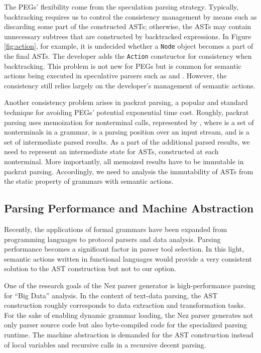 \documentclass[JIP]{ipsj}
\begin{document}
The PEGs' flexibility come from the speculation parsing strategy. Typically, backtracking requires us to control the consistency management by means such as discarding some part of the constructed ASTs; otherwise, the ASTs may contain unnecessary subtrees that are constructed by backtracked expressions. In Figure \ref{fig:action}, for example, it is undecided whether a {\tt Node} object becomes a part of the final ASTs. The developer adds the {\tt Action} constructor for consistency when backtracking.  This problem is not new for PEGs but is common for semantic actions being executed in speculative parsers such as \cite{PPPJ03_Elkhound} and \cite{LDTA11_SemanticAction}. However, the consistency  still relies largely on the developer's management of semantic actions. 

Another consistency problem arises in packrat parsing\cite{ICFP02_PackratParsing}, a popular and standard technique for avoiding  PEGs' potential exponential time cost. Roughly, packrat parsing uses memoization for nonterminal calls, represented by , where  is a set of nonterminals in a grammar,  is a parsing position over an input stream, and  is a set of intermediate parsed results. As a part of the additional parsed results, we need to represent an intermediate state for ASTs, constructed at each nonterminal. More importantly, all memoized results have to be immutable in packrat parsing. Accordingly, we need to analysis the immutability of ASTs from the static property of grammars with semantic actions.

\subsection{Parsing Performance and Machine Abstraction}

Recently, the applications of formal grammars have been expanded from programming languages to protocol parsers and data analysis\cite{IMC06_Binpac,WWW06_XMLScreamer,OOPSLA14_ParserCombinator}. Parsing performance becomes a significant factor in  parser tool selection. In this light, semantic actions written in functional languages would provide a very consistent solution to the AST construction but not to our option.

One of the research goals of the Nez parser generator is high-performance parsing for ``Big Data'' analysis. 
In the context of text-data parsing, the AST construction roughly corresponds to data extraction and transformation tasks. 
For the sake of enabling dynamic grammar loading, the Nez parser generates not only parser source code but also byte-compiled code for the specialized parsing runtime. The machine abstraction is demanded for the AST construction instead of local variables and recursive calls in a recursive decent parsing.
\end{document}

